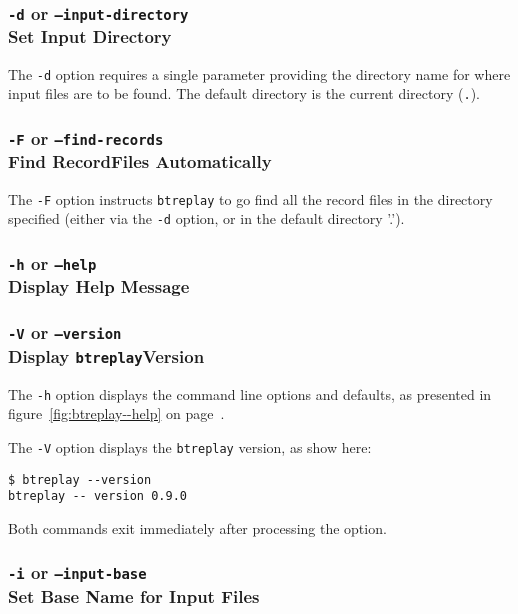 \documentclass{article}
\begin{document}
\subsubsection{\label{sec:p-o-d}\texttt{-d} or
\texttt{--input-directory}\\Set Input Directory}

The \texttt{-d} option requires a single parameter providing the directory
name for where input files are to be found. The default directory is the
current directory (\texttt{.}).

\subsubsection{\texttt{-F} or \texttt{--find-records}\\Find RecordFiles
Automatically}

The \texttt{-F} option instructs \texttt{btreplay} to go find all the
record files in the directory specified (either via the \texttt{-d}
option, or in the default directory '.').

\subsubsection{\texttt{-h} or \texttt{--help}\\Display Help Message}
\subsubsection{\texttt{-V} or \texttt{--version}\\Display
\texttt{btreplay}Version}

The \texttt{-h} option displays the command line options and
defaults, as presented in figure~\ref{fig:btreplay--help} on
page~\pageref{fig:btreplay--help}.

The \texttt{-V} option displays the \texttt{btreplay} version, as show here:

\begin{verbatim}
$ btreplay --version
btreplay -- version 0.9.0
\end{verbatim}

Both commands exit immediately after processing the option.

\subsubsection{\label{sec:p-o-i}\texttt{-i} or
\texttt{--input-base}\\Set Base Name for Input Files}
\end{document}
